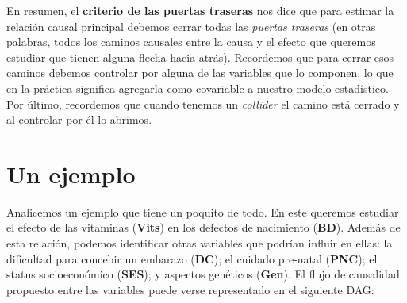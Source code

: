 \documentclass[
  letterpaper,
  DIV=11,
  numbers=noendperiod,
  oneside]{scrreprt}
\begin{document}
\begin{tcolorbox}[enhanced jigsaw, breakable, rightrule=.15mm, colbacktitle=quarto-callout-tip-color!10!white, bottomtitle=1mm, arc=.35mm, titlerule=0mm, left=2mm, toprule=.15mm, leftrule=.75mm, colback=white, opacitybacktitle=0.6, opacityback=0, colframe=quarto-callout-tip-color-frame, bottomrule=.15mm, coltitle=black, toptitle=1mm, title={El criterio de las puertas traseras}]
En resumen, el \textbf{criterio de las puertas traseras} nos dice que
para estimar la relación causal principal debemos cerrar todas las
\emph{puertas traseras} (en otras palabras, todos los caminos causales
entre la causa y el efecto que queremos estudiar que tienen alguna
flecha hacia atrás). Recordemos que para cerrar esos caminos debemos
controlar por alguna de las variables que lo componen, lo que en la
práctica significa agregarla como covariable a nuestro modelo
estadístico. Por último, recordemos que cuando tenemos un
\emph{collider} el camino está cerrado y al controlar por él lo abrimos.
\end{tcolorbox}

\hypertarget{un-ejemplo}{%
\section{Un ejemplo}\label{un-ejemplo}}

Analicemos un ejemplo que tiene un poquito de todo. En este queremos
estudiar el efecto de las vitaminas (\textbf{Vits}) en los defectos de
nacimiento (\textbf{BD}). Además de esta relación, podemos identificar
otras variables que podrían influir en ellas: la dificultad para
concebir un embarazo (\textbf{DC}); el cuidado pre-natal (\textbf{PNC});
el status socioeconómico (\textbf{SES}); y aspectos genéticos
(\textbf{Gen}). El flujo de causalidad propuesto entre las variables
puede verse representado en el siguiente DAG:
\end{document}
